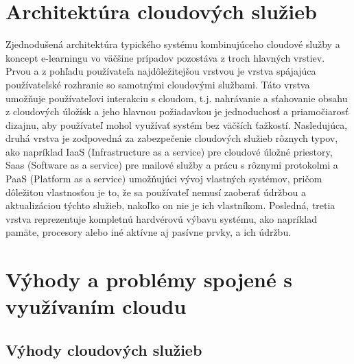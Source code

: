 \documentclass[10pt,slovak,a4paper]{article}%
\begin{document}
\section{Architektúra cloudových služieb}


Zjednodušená architektúra typického systému kombinujúceho cloudové služby a koncept e-learningu vo väčšine prípadov pozostáva z troch hlavných vrstiev. Prvou a z pohľadu používateľa najdôležitejšou vrstvou je vrstva spájajúca používateľské rozhranie so samotnými cloudovými službami\cite{Mhouti_benefits_challenges}. Táto vrstva umožňuje používateľovi interakciu s cloudom, t.j. nahrávanie a sťahovanie obsahu z cloudových úložísk a jeho hlavnou požiadavkou je jednoduchosť a priamočiarosť dizajnu, aby používateľ mohol využívať systém bez väčších ťažkostí. Nasledujúca, druhá vrstva je zodpovedná za zabezpečenie cloudových služieb rôznych typov, ako napríklad IaaS (Infrastructure as a service) pre cloudové úložné priestory, Saas (Software as a service) pre mailové služby a prácu s rôznymi protokolmi a PaaS (Platform as a service) umožňujúci vývoj vlastných systémov, pričom dôležitou vlastnosťou je to, že sa používateľ nemusí zaoberať údržbou a aktualizáciou týchto služieb, nakoľko on nie je ich vlastníkom\cite{Mhouti_benefits_challenges}. Posledná, tretia vrstva reprezentuje kompletnú hardvérovú výbavu systému, ako napríklad pamäte, procesory alebo iné aktívne aj pasívne prvky, a ich údržbu\cite{Mhouti_benefits_challenges}.


\section{Výhody a problémy spojené s využívaním cloudu}

\subsection{Výhody cloudových služieb}
\end{document}
